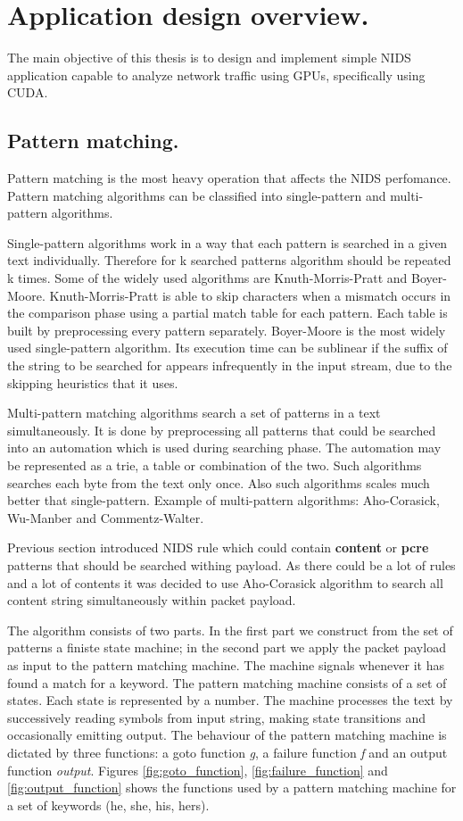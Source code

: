 \documentclass[thesis=M,english]{FITthesis}[2011/07/15]
\begin{document}
\section{Application design overview.}
The main objective of this thesis is to design and implement simple NIDS application capable to analyze network traffic using GPUs, specifically using CUDA. 
\subsection*{Pattern matching.}
Pattern matching is the most heavy operation that affects the NIDS perfomance. Pattern matching algorithms can be classified into single-pattern and multi-pattern algorithms.

Single-pattern algorithms work in a way that each pattern is searched in a given text individually. Therefore for k searched patterns algorithm should be repeated k times. Some of the widely used algorithms are Knuth-Morris-Pratt and Boyer-Moore. Knuth-Morris-Pratt is able to skip characters when a mismatch occurs in the comparison phase using a partial match table for each pattern. Each table is built by preprocessing every pattern separately. Boyer-Moore is the most widely used single-pattern algorithm. Its execution time can be sublinear if the suffix of the string to be searched for appears infrequently in the input stream, due to the skipping heuristics that it uses.

Multi-pattern matching algorithms search a set of patterns in a text simultaneously. It is done by preprocessing all patterns that could be searched into an automation which is used during searching phase. The automation may be represented as a trie, a table or combination of the two. Such algorithms searches each byte from the text only once. Also such algorithms scales much better that single-pattern. Example of multi-pattern algorithms: Aho-Corasick, Wu-Manber and Commentz-Walter.

Previous section introduced NIDS rule which could contain \textbf{content} or \textbf{pcre} patterns that should be searched withing payload. As there could be a lot of rules and a lot of contents it was decided to use Aho-Corasick algorithm to search all content string simultaneously within packet payload. 

The algorithm consists of two parts. In the first part we construct from the set of patterns a finiste state machine; in the second part we apply the packet payload as input to the pattern matching machine. The machine signals whenever it has found a match for a keyword. The pattern matching machine consists of a set of states. Each state is represented by a number. The machine processes the text by successively reading symbols from input string, making state transitions and occasionally emitting output. The behaviour of the pattern matching machine is dictated by three functions: a goto function \emph{g}, a failure function \emph{f} and an output function \emph{output}. Figures \ref{fig:goto_function}, \ref{fig:failure_function} and \ref{fig:output_function} shows the functions used by a pattern matching machine for a set of keywords (he, she, his, hers).
\end{document}
